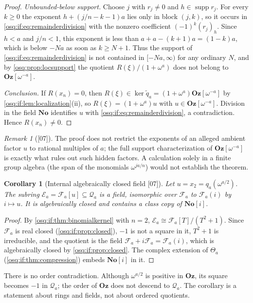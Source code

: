 \documentclass[11pt,letterpaper]{article}
\numberwithin{equation}{section}
\newtheorem{corollary}[corollary]{Corollary}
\theoremstyle{definition}
\theoremstyle{remark}
\newtheorem{remark}[remark]{Remark}
\theoremstyle{plain}
\newcommand{\No}{\mathbf{No}}
\newcommand{\Oz}{\mathbf{Oz}}
\newcommand{\SC}{\No[i]}
\newcommand{\FF}{\mathscr F}         %
\newcommand{\EE}{\mathscr E}         %
\newcommand{\Qa}{\mathcal Q}         %
\newcommand{\supp}{\operatorname{supp}}
\newcommand{\src}[1]{\textup{\textsf{[#1]}}}
\begin{document}
\begin{proof}
\emph{Unbounded-below support.} Choose $j$ with $r_j\ne0$ and $h\in\supp r_j$. For every
$k\ge0$ the exponent $h+(j/n-k-1)a$ lies only in block $(j,k)$, so it occurs in
\eqref{osq:if:eq:remainderdivision} with the nonzero coefficient $(-1)^k(r_j)_h$. Since
$h<a$ and $j/n<1$, this exponent is less than $a+a-(k+1)a=(1-k)a$, which is below $-Na$
as soon as $k\ge N+1$. Thus the support of \eqref{osq:if:eq:remainderdivision} is not
contained in $[-Na,\infty)$ for any ordinary $N$, and by \cref{osq:prop:locsupport} the
quotient $R(\xi)/(1+\omega^a)$ does not belong to $\Oz[\omega^{-a}]$.

\emph{Conclusion.} If $R(x_n)=0$, then $R(\xi)\in\ker\widetilde q_a
=(1+\omega^a)\Oz[\omega^{-a}]$ by \cref{osq:if:lem:localization}(ii), so
$R(\xi)=(1+\omega^a)u$ with $u\in\Oz[\omega^{-a}]$. Division in the field $\No$ identifies
$u$ with \eqref{osq:if:eq:remainderdivision}, a contradiction. Hence $R(x_n)\ne0$.
\end{proof}

\begin{remark}[\src{07}]\label{osq:if:rem:hiddenfactors}
The proof does not restrict the exponents of an alleged ambient factor $u$ to rational
multiples of $a$; the full support characterization of $\Oz[\omega^{-a}]$ is exactly what
rules out such hidden factors. A calculation solely in a finite group algebra (the span of
the monomials $\omega^{ja/n}$) would not establish the theorem.
\end{remark}

\begin{corollary}[Internal algebraically closed field \src{07}]\label{osq:if:cor:Ea}
Let $u=x_2=q_a(\omega^{a/2})$. The subring $\EE_a=\FF_a[u]\subseteq\Qa_a$ is a field,
isomorphic over $\FF_a$ to $\FF_a(i)$ by $i\mapsto u$. It is algebraically closed and
contains a class copy of $\SC$.
\end{corollary}

\begin{proof}
By \cref{osq:if:thm:binomialkernel} with $n=2$, $\EE_a\cong\FF_a[T]/(T^2+1)$. Since $\FF_a$
is real closed (\cref{osq:if:prop:closed}), $-1$ is not a square in it, $T^2+1$ is
irreducible, and the quotient is the field $\FF_a+i\FF_a=\FF_a(i)$, which is algebraically
closed by \cref{osq:if:prop:closed}. The complex extension of $\Theta_a$
(\cref{osq:if:thm:compression}) embeds $\SC$ in it.
\end{proof}

There is no order contradiction. Although $\omega^{a/2}$ is positive in $\Oz$, its square
becomes $-1$ in $\Qa_a$; the order of $\Oz$ does not descend to $\Qa_a$. The corollary is a
statement about rings and fields, not about ordered quotients.
\end{document}

